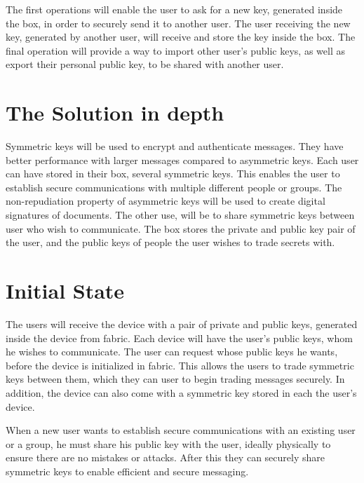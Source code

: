 The first operations will enable the user to ask for a new key, generated inside the box, in order to securely send it to another user. The user receiving the new key, generated by another user, will receive and store the key inside the box.
The final operation will provide a way to import other user's public keys, as well as export their personal public key, to be shared with another user.


\section{The Solution in depth}  \label{chap:arch:solution}

Symmetric keys will be used to encrypt and authenticate messages. They have better performance with larger messages compared to asymmetric keys. Each user can have stored in their box, several symmetric keys. This enables the user to establish secure communications with multiple different people or groups.
The non-repudiation property of asymmetric keys will be used to create digital signatures of documents. The other use, will be to share symmetric keys between user who wish to communicate. The box stores the private and public key pair of the user, and the public keys of people the user wishes to trade secrets with.

\section{Initial State} \label{chap:arch:initial-state}

The users will receive the device with a pair of private and public keys, generated inside the device from fabric. Each device will have the user's public keys, whom he wishes to communicate. The user can request whose public keys he wants, before the device is initialized in fabric. This allows the users to trade symmetric keys between them, which they can user to begin trading messages securely. In addition, the device can also come with a symmetric key stored in each the user's device.

When a new user wants to establish secure communications with an existing user or a group, he must share his public key with the user, ideally physically to ensure there are no mistakes or attacks. After this they can securely share symmetric keys to enable efficient and secure messaging.

